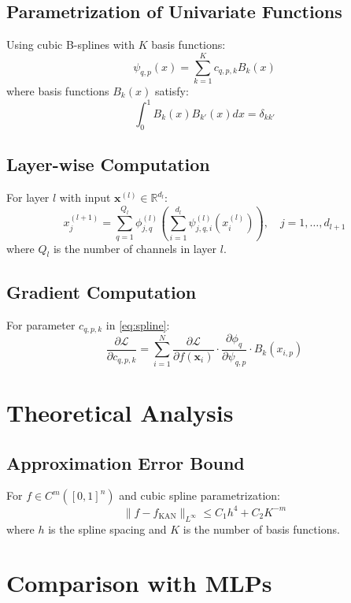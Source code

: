 \documentclass[12pt]{article}
\theoremstyle{plain}
\theoremstyle{definition}
\begin{document}
\subsection{Parametrization of Univariate Functions}
Using cubic B-splines with $ K $ basis functions:
\begin{equation}
    \psi_{q,p}(x) = \sum_{k=1}^K c_{q,p,k} B_k(x)
    \label{eq:spline}
\end{equation}
where basis functions $ B_k(x) $ satisfy:
$$
\int_0^1 B_k(x)B_{k'}(x)dx = \delta_{kk'}
$$

\subsection{Layer-wise Computation}
For layer $ l $ with input $\mathbf{x}^{(l)} \in \mathbb{R}^{d_l}$:
\begin{equation}
    x_j^{(l+1)} = \sum_{q=1}^{Q_l} \phi_{j,q}^{(l)} \left( \sum_{i=1}^{d_l} \psi_{j,q,i}^{(l)}(x_i^{(l)}) \right),\quad j=1,\ldots,d_{l+1}
    \label{eq:KANlayer}
\end{equation}
where $ Q_l $ is the number of channels in layer $ l $.

\subsection{Gradient Computation}
For parameter $ c_{q,p,k} $ in \eqref{eq:spline}:
$$
\frac{\partial \mathcal{L}}{\partial c_{q,p,k}} = \sum_{i=1}^N \frac{\partial \mathcal{L}}{\partial f(\mathbf{x}_i)} \cdot \frac{\partial \phi_q}{\partial \psi_{q,p}} \cdot B_k(x_{i,p})
$$

\section{Theoretical Analysis}

\subsection{Approximation Error Bound}
For $ f \in C^m([0,1]^n) $ and cubic spline parametrization:
$$
\| f - f_{\text{KAN}} \|_{L^\infty} \leq C_1 h^4 + C_2 K^{-m}
$$
where $ h $ is the spline spacing and $ K $ is the number of basis functions.

\section{Comparison with MLPs}
\end{document}
